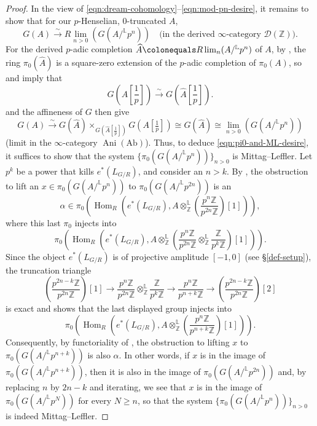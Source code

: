 \documentclass[11pt, reqno]{amsart}
\newcommand{\gA}{\alpha}
\newcommand{\bL}{\mathbb{L}}
\newcommand{\bZ}{\mathbb{Z}}
\DeclareMathOperator{\Ani}{Ani}		%
\DeclareMathOperator{\Hom}{Hom}		%
\providecommand{\Ab}{\mathrm{Ab}}
\newcommand{\ce}{\colonequals}
\newcommand{\isomto}{\overset{\sim}{\longrightarrow}}
\providecommand{\p}[1]{\left(#1\right)}
\newcommand{\ra}{\rightarrow}
\newcommand{\tensor}{\otimes} 			%
\newcommand{\wh}{\widehat}
\providecommand{\f}[2]{\frac{#1}{#2}}
\newcommand{\x}{\text}
\newcommand{\q}{\quad}
\newcommand{\tst}{\textstyle}
\newcommand{\be}{\begin{equation}}
\newcommand{\ee}{\end{equation}}
\numberwithin{equation}{numberingbase}
\theoremstyle{thms}
\theoremstyle{claims}
\theoremstyle{defs}
\theoremstyle{thms}
\theoremstyle{defs}
\theoremstyle{subsection-tweak}
\theoremstyle{subsection-tweak}
\begin{document}
\begin{proof}
In the view of \eqref{eqn:dream-cohomology}--\eqref{eqn:mod-pn-desire}, it remains to show that for our $p$-Henselian, $0$-truncated $A$,
\be \label{eqn:pi0-and-ML-desire}
\tst G(A) \isomto R\lim_{n > 0}( G(A/^\bL p^n)) \q\x{(in the derived $\infty$-category $\mathcal D(\mathbb Z)$).}
\ee
For the derived $p$-adic completion $\widehat{A} \ce R\lim_n (A/^\bL p^n)$ of $A$, by  , the ring $\pi_0(\wh{A})$ 
is a square-zero extension of the $p$-adic completion of $\pi_0(A)$, so  and  %
imply that 
\[
\tst G(A[\f{1}{p}]) \isomto G(\widehat{A}[\f{1}{p}]).
\]
 and the affineness of $G$ then give
\[
\tst G(A) \isomto G(\widehat{A})\times_{G(\widehat{A}[\tfrac 1p])} G(A[\tfrac 1p]) \cong G(\wh{A}) \cong  \lim_{n > 0}( G(A/^\bL p^n))
\]
(limit in the $\infty$-category $\Ani(\Ab)$). Thus, to deduce \eqref{eqn:pi0-and-ML-desire}, it suffices to show that the system $\{\pi_0 (G(A/^\bL p^n))\}_{n > 0}$ is Mittag--Leffler. Let $p^k$ be a power that kills $e^*(L_{G/R})$, and consider an $n > k$. By , the obstruction to lift an $x \in \pi_0(G(A/^\bL p^n))$ to $\pi_0(G(A/^\bL p^{2n}))$ is an
\[%
\tst \gA \in \pi_0\!\p{\Hom_R\!\p{e^*(L_{G/R}), A\tensor^\bL_\bZ(\frac{p^n\bZ}{p^{2n}\bZ})[1]}\!},
\]
where this last $\pi_0$ injects into
\[
\tst\pi_0\!\p{\Hom_R\!\p{e^*(L_{G/R}), A\tensor^\bL_\bZ(\frac{p^n\bZ}{p^{2n}\bZ} \tensor^\bL_\bZ \frac{\bZ}{p^k\bZ})[1]}\!}\!.
\]%
Since the object $e^*(L_{G/R})$ is of projective amplitude $[-1, 0]$ (see \S\ref{def-setup}), the truncation triangle 
\[
\tst (\frac{p^{2n - k}\bZ}{p^{2n}\bZ})[1] \ra \frac{p^n\bZ}{p^{2n}\bZ} \tensor^\bL_\bZ \frac{\bZ}{p^k\bZ} \ra \frac{p^n\bZ}{p^{n + k}\bZ} \ra \p{\frac{p^{2n - k}\bZ}{p^{2n}\bZ}}[2]
\]
is exact and shows that the last displayed group injects into
\[%
\tst \pi_0\!\p{\Hom_R\!\p{e^*(L_{G/R}), A\tensor^\bL_\bZ (\frac{p^n\bZ}{p^{n + k}\bZ})[1]}\!}\!.
\]%
Consequently, by functoriality of , the obstruction to lifting $x$ to $\pi_0(G(A/^\bL p^{n + k}))$ is also $\gA$. In other words, if $x$ is in the image of $\pi_0(G(A/^\bL p^{n + k}))$, then it is also in the image of $\pi_0(G(A/^\bL p^{2n}))$ and, by replacing $n$ by $2n - k$ and iterating, we see that $x$ is in the image of $\pi_0(G(A/^\bL p^N))$ for every $N \ge n$, so that the system $\{\pi_0 (G(A/^\bL p^n))\}_{n > 0}$ is indeed Mittag--Leffler.
\end{proof}
\end{document}
